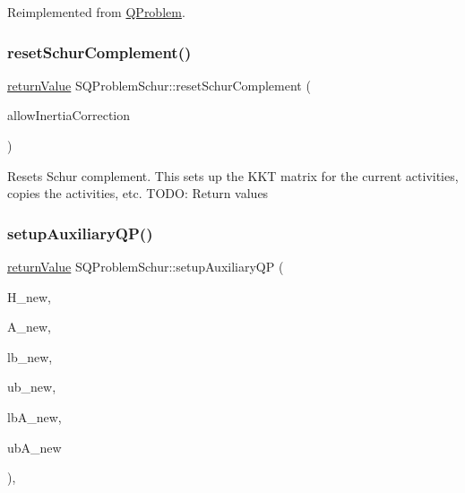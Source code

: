 Reimplemented from \hyperlink{class_q_problem_a2f752d39b6935d929b963363a314b6bd}{Q\+Problem}.

\mbox{\label{class_s_q_problem_schur_a8b069afa2180ce1bacb47246b1154b05}} 
\subsubsection{\texorpdfstring{reset\+Schur\+Complement()}{resetSchurComplement()}}
{\footnotesize\ttfamily \hyperlink{_message_handling_8hpp_a81d556f613bfbabd0b1f9488c0fa865e}{return\+Value} S\+Q\+Problem\+Schur\+::reset\+Schur\+Complement (\begin{DoxyParamCaption}\item[{\hyperlink{_types_8hpp_a20f82124c82b6f5686a7fce454ef9089}{Boolean\+Type}}]{allow\+Inertia\+Correction }\end{DoxyParamCaption})}

Resets Schur complement. This sets up the K\+KT matrix for the current activities, copies the activities, etc. T\+O\+DO\+: Return values \mbox{\label{class_s_q_problem_schur_ad73504bed5ff64956f18666bca9f54b2}} 
\subsubsection{\texorpdfstring{setup\+Auxiliary\+Q\+P()}{setupAuxiliaryQP()}}
{\footnotesize\ttfamily \hyperlink{_message_handling_8hpp_a81d556f613bfbabd0b1f9488c0fa865e}{return\+Value} S\+Q\+Problem\+Schur\+::setup\+Auxiliary\+QP (\begin{DoxyParamCaption}\item[{\hyperlink{class_symmetric_matrix}{Symmetric\+Matrix} $\ast$}]{H\+\_\+new,  }\item[{\hyperlink{class_matrix}{Matrix} $\ast$}]{A\+\_\+new,  }\item[{const \hyperlink{qp_o_a_s_e_s__wrapper_8h_a0d00e2b3dfadee81331bbb39068570c4}{real\+\_\+t} $\ast$}]{lb\+\_\+new,  }\item[{const \hyperlink{qp_o_a_s_e_s__wrapper_8h_a0d00e2b3dfadee81331bbb39068570c4}{real\+\_\+t} $\ast$}]{ub\+\_\+new,  }\item[{const \hyperlink{qp_o_a_s_e_s__wrapper_8h_a0d00e2b3dfadee81331bbb39068570c4}{real\+\_\+t} $\ast$}]{lb\+A\+\_\+new,  }\item[{const \hyperlink{qp_o_a_s_e_s__wrapper_8h_a0d00e2b3dfadee81331bbb39068570c4}{real\+\_\+t} $\ast$}]{ub\+A\+\_\+new }\end{DoxyParamCaption})\hspace{0.3cm}{\ttfamily [protected]}, {\ttfamily [virtual]}}


